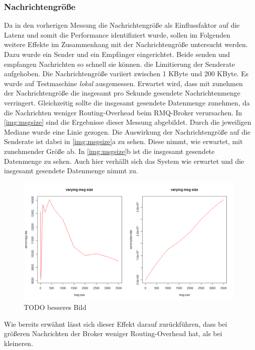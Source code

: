 \subsubsection{Nachrichtengröße}
Da in den vorherigen Messung die Nachrichtengröße als Einflussfaktor auf die Latenz und somit die Performance identifiziert wurde, sollen im Folgenden weitere Effekte im Zusammenhang mit der Nachrichtengröße untersucht werden. Dazu wurde ein Sender und ein Empfänger eingerichtet. Beide senden und empfangen Nachrichten so schnell sie können. die Limitierung der Senderate aufgehoben. Die Nachrichtengröße variiert zwischen 1 KByte und 200 KByte. Es wurde auf Testmaschine \textit{lokal} ausgemessen. Erwartet wird, dass mit zunehmen der Nachrichtengröße die insgesamt pro Sekunde gesendete Nachrichtenmenge verringert. Gleichzeitig sollte die insgesamt gesendete Datenmenge zunehmen, da die Nachrichten weniger Routing-Overhead beim RMQ-Broker verursachen.
In \autoref{img:msgsize} sind die Ergebnisse dieser Messung abgebildet. Durch die jeweiligen Mediane wurde eine Linie gezogen. Die Auswirkung der Nachrichtengröße auf die Senderate ist dabei in \autoref{img:msgsize}a zu sehen. Diese nimmt, wie erwartet, mit zunehmender Größe ab. In \autoref{img:msgsize}b ist die insgesamt gesendete Datenmenge zu sehen. Auch hier verhällt sich das System wie erwartet und die insgesamt gesendete Datenmenge nimmt zu.
\begin{figure}
\center
  \includegraphics[width=1\textwidth]{images/msg-size.png}
  \caption{TODO besseres Bild}
  \label{img:msgsize}
\end{figure}
Wie bereits erwähnt lässt sich dieser Effekt darauf zurückführen, dass bei größeren Nachrichten der Broker weniger Routing-Overhead hat, als bei kleineren.

